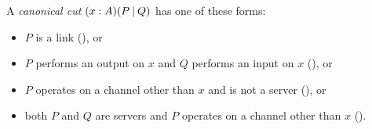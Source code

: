 \begin{code}
\AgdaSpace{}%
\AgdaSpace{}%
\AgdaSpace{}%
\AgdaSymbol{))}\<%
\\
%
\>[2]%
\>[14]\AgdaSymbol{:}%
\>[1487I]\AgdaSpace{}%
\AgdaSpace{}%
\AgdaSpace{}%
\AgdaSpace{}%
\AgdaSymbol{\}}\AgdaSpace{}%
\AgdaSymbol{(}\AgdaSpace{}%
\AgdaSymbol{:}\AgdaSpace{}%
\AgdaSpace{}%
\AgdaSpace{}%
\AgdaSpace{}%
\AgdaOperator{\AgdaDatatype{+}}\AgdaSpace{}%
\AgdaSymbol{)}\AgdaSpace{}%
\<%
\\
\>[.][@{}l@{}]\<[1487I]%
\>[16]\AgdaSpace{}%
\AgdaSpace{}%
\AgdaSpace{}%
\AgdaSpace{}%
\AgdaSymbol{(}\AgdaSpace{}%
\AgdaSymbol{\{}\AgdaSymbol{\}}\AgdaSpace{}%
\AgdaSymbol{(}\AgdaSpace{}%
\AgdaSpace{}%
\AgdaSpace{}%
\AgdaSpace{}%
\AgdaSymbol{))}\<%
\\
%
\>[2]%
\>[14]\AgdaSymbol{:}%
\>[1510I]\AgdaSpace{}%
\AgdaSpace{}%
\AgdaSpace{}%
\AgdaSpace{}%
\AgdaSymbol{\}}\AgdaSpace{}%
\AgdaSymbol{(}\AgdaSpace{}%
\AgdaSymbol{:}\AgdaSpace{}%
\AgdaSpace{}%
\AgdaSpace{}%
\AgdaSpace{}%
\AgdaOperator{\AgdaDatatype{+}}\AgdaSpace{}%
\AgdaSymbol{)}\AgdaSpace{}%
\<%
\\
\>[.][@{}l@{}]\<[1510I]%
\>[16]\AgdaSpace{}%
\AgdaSpace{}%
\AgdaSpace{}%
\AgdaSpace{}%
\AgdaSpace{}%
\<%
\\
%
\>[16]\AgdaSpace{}%
\AgdaSymbol{(}\AgdaSpace{}%
\AgdaSymbol{\{}\AgdaSymbol{\}}\AgdaSpace{}%
\AgdaSymbol{(}\AgdaSpace{}%
\AgdaSpace{}%
\AgdaSpace{}%
\AgdaSpace{}%
\AgdaSymbol{))}\<%
\end{code}

A \emph{canonical cut} $\Cut[A]\x{P}{Q}$ has one of these forms:
\begin{itemize}
\item $P$ is a link (), or
\item $P$ performs an output on $x$ and $Q$ performs an input on $x$
  (), or
\item $P$ operates on a channel other than $x$ and is not a server
(), or
\item both $P$ and $Q$ are servers and $P$ operates on a channel other than $x$
().
\end{itemize}

